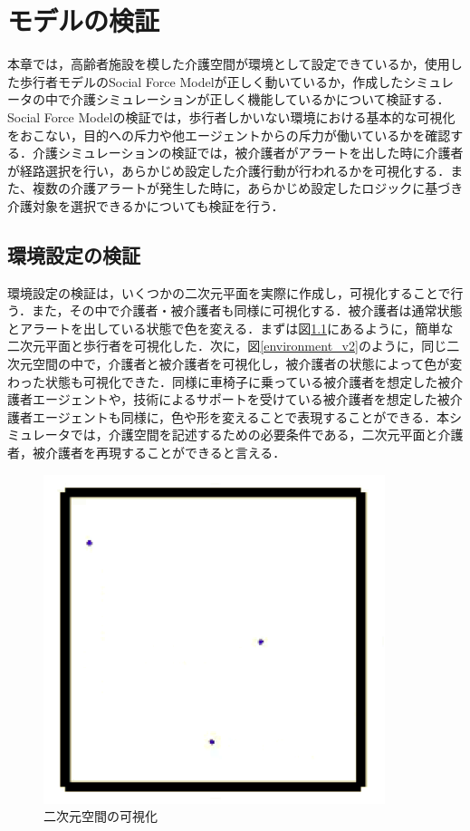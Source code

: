 \chapter{モデルの検証}

本章では，高齢者施設を模した介護空間が環境として設定できているか，使用した歩行者モデルのSocial Force Modelが正しく動いているか，作成したシミュレータの中で介護シミュレーションが正しく機能しているかについて検証する．Social Force Modelの検証では，歩行者しかいない環境における基本的な可視化をおこない，目的への斥力や他エージェントからの斥力が働いているかを確認する．介護シミュレーションの検証では，被介護者がアラートを出した時に介護者が経路選択を行い，あらかじめ設定した介護行動が行われるかを可視化する．また、複数の介護アラートが発生した時に，あらかじめ設定したロジックに基づき介護対象を選択できるかについても検証を行う．

\section{環境設定の検証}

環境設定の検証は，いくつかの二次元平面を実際に作成し，可視化することで行う．また，その中で介護者・被介護者も同様に可視化する．被介護者は通常状態とアラートを出している状態で色を変える．まずは図\ref{environment_v1}にあるように，簡単な二次元平面と歩行者を可視化した．次に，図\ref{environment_v2}のように，同じ二次元空間の中で，介護者と被介護者を可視化し，被介護者の状態によって色が変わった状態も可視化できた．同様に車椅子に乗っている被介護者を想定した被介護者エージェントや，技術によるサポートを受けている被介護者を想定した被介護者エージェントも同様に，色や形を変えることで表現することができる．本シミュレータでは，介護空間を記述するための必要条件である，二次元平面と介護者，被介護者を再現することができると言える．

\begin{figure}[htb]
\begin{center}
 \includegraphics[scale=0.4]{figures/environment_v1}
 \caption[二次元空間の可視化]{二次元空間の可視化 \label{environment_v1}}
\end{center}
\end{figure}


